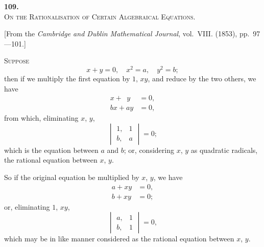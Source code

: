 \documentclass[11pt,a4paper]{book}
\begin{document}
\begin{center}
{\Large\bfseries 109.}\\[0.5em]
{\large\scshape On the Rationalisation of Certain Algebraical Equations.}
\end{center}
\vspace{0.3em}
\begin{center}
\small [From the \textit{Cambridge and Dublin Mathematical Journal}, vol.~VIII. (1853), pp.~97---101.]
\end{center}
\vspace{0.5em}

\textsc{Suppose}
\[
x + y = 0, \quad x^2 = a, \quad y^2 = b;
\]
then if we multiply the first equation by $1$, $xy$, and reduce by the two others, we have
\begin{align*}
x + \phantom{a}y &= 0,\\
bx + ay &= 0,
\end{align*}
from which, eliminating $x$, $y$,
\[
\begin{vmatrix}
1, & 1 \\
b, & a
\end{vmatrix} = 0;
\]
which is the equation between $a$ and $b$; or, considering $x$, $y$ as quadratic radicals, the rational equation between $x$, $y$.

So if the original equation be multiplied by $x$, $y$, we have
\begin{align*}
a + xy &= 0,\\
b + xy &= 0;
\end{align*}
or, eliminating $1$, $xy$,
\[
\begin{vmatrix}
a, & 1 \\
b, & 1
\end{vmatrix} = 0,
\]
which may be in like manner considered as the rational equation between $x$, $y$.
\end{document}
